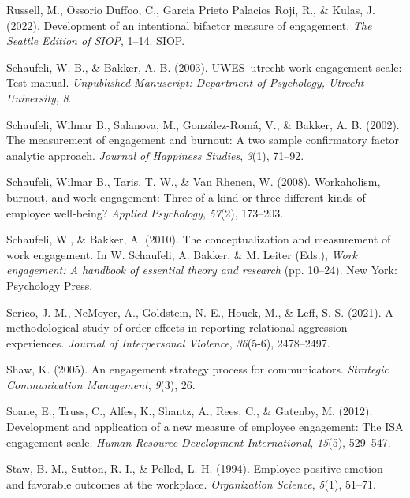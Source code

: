 \documentclass[
  man]{apa6}
\newlength{\cslhangindent}
\newlength{\cslentryspacingunit} %
\newenvironment{CSLReferences}[2] %
 {%
  \setlength{\parindent}{0pt}
  \ifodd #1
  \let\oldpar\par
  \def\par{\hangindent=\cslhangindent\oldpar}
  \fi
  \setlength{\parskip}{#2\cslentryspacingunit}
 }%
 {}
\begin{document}
\begin{CSLReferences}{1}{0}
\leavevmode{}%
Russell, M., Ossorio Duffoo, C., Garcia Prieto Palacios Roji, R., \& Kulas, J. (2022). Development of an intentional bifactor measure of engagement. \emph{The Seattle Edition of SIOP}, 1--14. SIOP.

\leavevmode{}%
Schaufeli, W. B., \& Bakker, A. B. (2003). {UWES}--utrecht work engagement scale: Test manual. \emph{Unpublished Manuscript: Department of Psychology, Utrecht University}, \emph{8}.

\leavevmode{}%
Schaufeli, Wilmar B., Salanova, M., González-Romá, V., \& Bakker, A. B. (2002). The measurement of engagement and burnout: A two sample confirmatory factor analytic approach. \emph{Journal of Happiness Studies}, \emph{3}(1), 71--92.

\leavevmode{}%
Schaufeli, Wilmar B., Taris, T. W., \& Van Rhenen, W. (2008). Workaholism, burnout, and work engagement: Three of a kind or three different kinds of employee well-being? \emph{Applied Psychology}, \emph{57}(2), 173--203.

\leavevmode{}%
Schaufeli, W., \& Bakker, A. (2010). The conceptualization and measurement of work engagement. In W. Schaufeli, A. Bakker, \& M. Leiter (Eds.), \emph{Work engagement: A handbook of essential theory and research} (pp. 10--24). New York: Psychology Press.

\leavevmode{}%
Serico, J. M., NeMoyer, A., Goldstein, N. E., Houck, M., \& Leff, S. S. (2021). A methodological study of order effects in reporting relational aggression experiences. \emph{Journal of Interpersonal Violence}, \emph{36}(5-6), 2478--2497.

\leavevmode{}%
Shaw, K. (2005). An engagement strategy process for communicators. \emph{Strategic Communication Management}, \emph{9}(3), 26.

\leavevmode{}%
Soane, E., Truss, C., Alfes, K., Shantz, A., Rees, C., \& Gatenby, M. (2012). Development and application of a new measure of employee engagement: The ISA engagement scale. \emph{Human Resource Development International}, \emph{15}(5), 529--547.

\leavevmode{}%
Staw, B. M., Sutton, R. I., \& Pelled, L. H. (1994). Employee positive emotion and favorable outcomes at the workplace. \emph{Organization Science}, \emph{5}(1), 51--71.


\end{CSLReferences}
\end{document}
